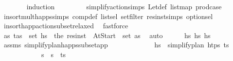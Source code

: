 \begin{isabellebody}
\ \ \ \ \ \ \isamarkupfalse%
\ {\isacharparenleft}{\kern0pt}induction\ {\isasympi}{\isacharparenright}{\kern0pt}\isanewline
\ \ \ \ \ \ \isamarkupfalse%
\ simplify{\isacharunderscore}{\kern0pt}action{\isachardot}{\kern0pt}simps\ Let{\isacharunderscore}{\kern0pt}def\ list{\isachardot}{\kern0pt}map\ prod{\isachardot}{\kern0pt}case\isanewline
\ \ \ \ \ \ \isamarkupfalse%
\ insort{\isacharunderscore}{\kern0pt}mult{\isacharunderscore}{\kern0pt}happs{\isachardot}{\kern0pt}simps\ comp{\isacharunderscore}{\kern0pt}def\ list{\isachardot}{\kern0pt}sel\ set{\isacharunderscore}{\kern0pt}filter\ res{\isacharunderscore}{\kern0pt}inst{\isachardot}{\kern0pt}simps\ option{\isachardot}{\kern0pt}sel\isanewline
\ \ \ \ \ \ \isamarkupfalse%
\ insort{\isacharunderscore}{\kern0pt}happ{\isacharunderscore}{\kern0pt}action{\isacharunderscore}{\kern0pt}subset{\isacharunderscore}{\kern0pt}relaxed\ \isamarkupfalse%
\ fastforce{\isacharplus}{\kern0pt}\isanewline
\ \ \ \ \isamarkupfalse%
\ {\isachardoublequoteopen}{\isasymexists}as{\isachardot}{\kern0pt}\ {\isacharparenleft}{\kern0pt}t\isactrlsub {\isasympi}{\isacharcomma}{\kern0pt}as{\isacharparenright}{\kern0pt}\ {\isasymin}\ set\ hs{\isacharprime}{\kern0pt}\ {\isasymand}\ the\ {\isacharparenleft}{\kern0pt}res{\isacharunderscore}{\kern0pt}inst\ {\isasympi}\ At{\isacharunderscore}{\kern0pt}Start{\isacharparenright}{\kern0pt}\ {\isasymin}\ set\ as{\isachardoublequoteclose}\ \isamarkupfalse%
\ auto\isanewline
\ \ \ \ \isamarkupfalse%
\ {\isachardoublequoteopen}hs{\isacharprime}{\kern0pt}\ {\isasymsubseteq}\isactrlsub h\isactrlsub s\ hs{\isachardoublequoteclose}\isanewline
\ \ \ \ \ \ \isamarkupfalse%
\ assms\ simplify{\isacharunderscore}{\kern0pt}plan{\isacharunderscore}{\kern0pt}happs{\isacharunderscore}{\kern0pt}subset{\isacharunderscore}{\kern0pt}app\ \isanewline
\ \ \ \ \ \ \ \ \ \ \ \ {\isacartoucheopen}hs{\isacharprime}{\kern0pt}\ {\isacharequal}{\kern0pt}\ simplify{\isacharunderscore}{\kern0pt}plan\ htps\ {\isacharparenleft}{\kern0pt}{\isacharparenleft}{\kern0pt}t\isactrlsub {\isasympi}{\isacharcomma}{\kern0pt}{\isasympi}{\isacharparenright}{\kern0pt}{\isacharhash}{\kern0pt}{\isasympi}s\ \isanewline
\ \ \ \ \ \ \ \ \ \ \ \ {\isacartoucheopen}{\isasympi}s\ {\isacharequal}{\kern0pt}\ {\isasympi}s\ {\isacharat}{\kern0pt}\ {\isacharparenleft}{\kern0pt}{\isacharparenleft}{\kern0pt}t\isactrlsub {\isasympi}{\isacharcomma}{\kern0pt}{\isasympi}{\isacharparenright}{\kern0pt}{\isacharhash}{\kern0pt}{\isasympi}s\isanewline

\end{isabellebody}
